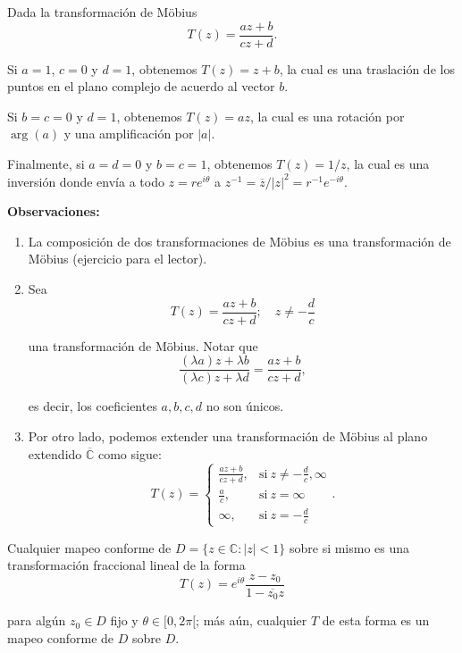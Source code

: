 \begin{ejemplo}
Dada la transformación de Möbius
$$T(z) = \frac{az+b}{cz+d}.$$

Si $a = 1$, $c = 0$ y $d = 1$, obtenemos $T(z) = z+b$, la cual es una traslación de los puntos en el plano complejo de acuerdo al vector $b$.

Si $b = c = 0$ y $d = 1$, obtenemos $T(z) = az$, la cual es una rotación por $\arg(a)$ y una amplificación por $|a|$.

Finalmente, si $a = d = 0$ y $b = c = 1$, obtenemos $T(z) = 1/z$, la cual es una inversión donde envía a todo $z = r e^{i\theta}$ a $z^{-1} = \overline{z}/|z|^2 = r^{-1}  e^{-i\theta}$.
\end{ejemplo}

\textbf{Observaciones:}

\begin{enumerate}
    \item La composición de dos transformaciones de Möbius es una transformación de Möbius (ejercicio para el lector).
    
    \item Sea
    $$T(z) = \frac{az+b}{cz+d}; \quad z \neq - \frac{d}{c}$$
    
    una transformación de Möbius. Notar que
    $$\frac{(\lambda a) z + \lambda b}{(\lambda c)z + \lambda d} = \frac{az + b}{cz+d},$$
    
    es decir, los coeficientes $a, b, c, d$ no son únicos.
    
    \item Por otro lado, podemos extender una transformación de Möbius al plano extendido $\overline{\mathbb{C}}$ como sigue:
    $$T(z) = \left\{ \begin{array}{cl}
        \frac{az+b}{cz+d}, & \mbox{si}~ z \neq - \frac{d}{c}, \infty  \\
        \frac{a}{c}, &  \mbox{si}~ z = \infty \\
        \infty, & \mbox{si}~ z = - \frac{d}{c}
    \end{array} \right. .$$
\end{enumerate}    

\begin{propo}
Cualquier mapeo conforme de $D = \{z \in \mathbb{C}: |z| < 1\}$ sobre si mismo es una transformación fraccional lineal de la forma
$$T(z) = e^{i\theta} \frac{z-z_0}{1-\overline{z_0} z}$$

para algún $z_0 \in D$ fijo y $\theta \in [0,2\pi[$; más aún, cualquier $T$ de esta forma es un mapeo conforme de $D$ sobre $D$.
\end{propo}

